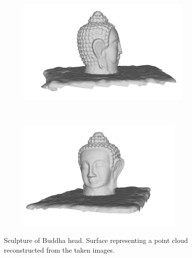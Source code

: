 \begin{figure}[ht]
  \centering
  \begin{subfigure}[b]{0.45\textwidth}
    \includegraphics[width=0.95\textwidth]{images/LADIO_01.png}
    \vspace{2mm}
  \end{subfigure}
  ~
  \begin{subfigure}[b]{0.45\textwidth}
    \includegraphics[width=0.90\textwidth]{images/LADIO_02.png}
  \end{subfigure}
  \caption{Sculpture of Buddha head. Surface representing a point cloud reconstructed from the taken images.}
\end{figure}

